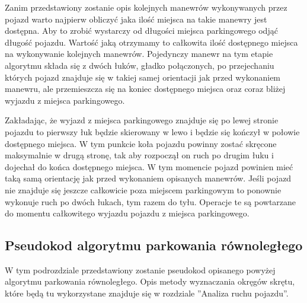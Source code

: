 \documentclass[a4paper,11pt,twoside]{report}
\theoremstyle{definition}
\begin{document}
Zanim przedstawiony zostanie opis kolejnych manewrów wykonywanych przez pojazd warto najpierw  obliczyć jaka ilość miejsca na takie manewry jest dostępna. Aby to zrobić wystarczy od długości miejsca parkingowego odjąć długość pojazdu. Wartość jaką otrzymamy to całkowita ilość dostępnego miejsca na wykonywanie kolejnych manewrów. Pojedynczy manewr na tym etapie algorytmu składa się z dwóch łuków, gładko połączonych, po przejechaniu których pojazd znajduje się w takiej samej orientacji jak przed wykonaniem manewru, ale przemieszcza się na koniec dostępnego miejsca oraz coraz bliżej wyjazdu z miejsca parkingowego.

Zakładając, że wyjazd z miejsca parkingowego znajduje się po lewej stronie pojazdu to pierwszy łuk będzie skierowany w lewo i będzie się kończył w połowie dostępnego miejsca. W tym punkcie koła pojazdu powinny zostać skręcone maksymalnie w drugą stronę, tak aby rozpoczął on ruch po drugim łuku i dojechał do końca dostępnego miejsca. W tym momencie pojazd powinien mieć taką samą orientację jak przed wykonaniem opisanych manewrów. Jeśli pojazd nie znajduje się jeszcze całkowicie poza miejscem parkingowym to ponownie wykonuje ruch po dwóch łukach, tym razem do tyłu. Operacje te są powtarzane do momentu całkowitego wyjazdu pojazdu z miejsca parkingowego.

\subsection{Pseudokod algorytmu parkowania równoległego}

W tym podrozdziale przedstawiony zostanie pseudokod opisanego powyżej algorytmu parkowania równoległego. Opis metody wyznaczania okręgów skrętu, które będą tu wykorzystane znajduje się w rozdziale ''Analiza ruchu pojazdu''.
\end{document}
